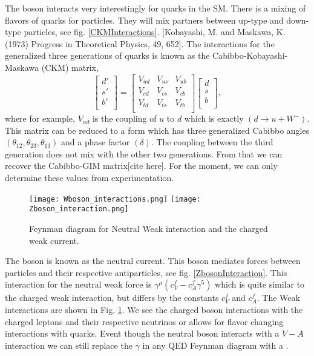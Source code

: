 The \W{} boson interacts very interestingly for quarks in the SM. There is a mixing of flavors of quarks for particles. They will mix partners between up-type and down-type particles, see fig. \ref{CKMInteractions}. [Kobayashi, M. and Maskawa, K. (1973) Progress in Theoretical Physics, 49, 652]. The interactions for the generalized three generations of quarks is known as the Cabibbo-Kobayashi-Maskawa (CKM) matrix,
\begin{equation}\label{CKM}
\begin{bmatrix}
d' \\
s' \\
b' \\
\end{bmatrix} =
\begin{bmatrix}
V_{ud} & V_{us} & V_{ub} \\
V_{cd} & V_{cs} & V_{cb} \\
V_{td} & V_{ts} & V_{tb} \\
\end{bmatrix}
\begin{bmatrix}
d \\
s \\
b \\
\end{bmatrix},
\end{equation}
where for example, $V_{ud}$ is the coupling of $u$ to $d$ which is exactly $(d\rightarrow u+W^-)$. This matrix can be reduced to a form which has three generalized Cabibbo angles $(\theta_{12},\theta_{23},\theta_{13})$ and a phase factor $(\delta)$. The coupling between the third generation does not mix with the other two generations. From that we can recover the Cabibbo-GIM matrix[cite here]. For the moment, we can only determine these values from experimentation. 

\begin{figure}[!htb]
	  \texttt{[image: Wboson\_interactions.png]}
	\endminipage\hfill
	  \texttt{[image: Zboson\_interaction.png]}
	\endminipage\hfill
	\caption[Weak Feynman Diagrams]{Feynman diagram for Neutral Weak interaction and the charged weak current.}
 	\label{WeakRules} 
\end{figure}

The \Z{} boson is known as the neutral current. This boson mediates forces between particles and their respective antiparticles, see fig. \ref{ZbosonInteraction}. This interaction for the neutral weak force is $\gamma^\mu(c_V^f-c_A^f\gamma^5)$ which is quite similar to the charged weak interaction, but differs by the constants $c_V^f$ and $c_A^f$. The Weak interactions are shown in Fig. \ref{WeakRules}. We see the charged \W{} boson interactions with the charged leptons and their respective neutrinos or allows for flavor changing interactions with quarks. Event though the neutral \Z{} boson interacts with a $V-A$ interaction we can still replace the $\gamma$ in any QED Feynman diagram with a \Z{}.

